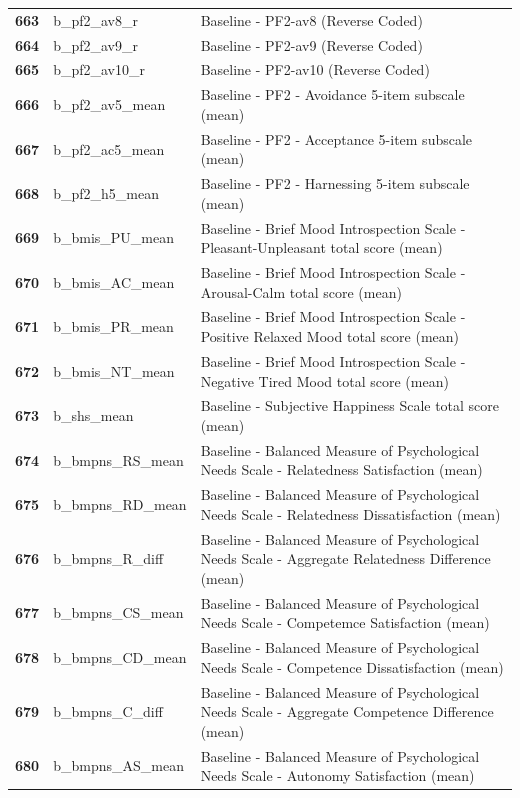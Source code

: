 \documentclass[
  letterpaper,
  DIV=11,
  numbers=noendperiod]{scrartcl}
\begin{document}
\begin{longtable}[t]{>{}cll}
\textbf{663} & b\_pf2\_av8\_r & Baseline - PF2-av8 (Reverse Coded)\\
\textbf{664} & b\_pf2\_av9\_r & Baseline - PF2-av9 (Reverse Coded)\\
\textbf{665} & b\_pf2\_av10\_r & Baseline - PF2-av10 (Reverse Coded)\\
\addlinespace
\textbf{666} & b\_pf2\_av5\_mean & Baseline - PF2 - Avoidance 5-item subscale (mean)\\
\textbf{667} & b\_pf2\_ac5\_mean & Baseline - PF2 - Acceptance 5-item subscale (mean)\\
\textbf{668} & b\_pf2\_h5\_mean & Baseline - PF2 - Harnessing 5-item subscale (mean)\\
\textbf{669} & b\_bmis\_PU\_mean & Baseline - Brief Mood Introspection Scale - Pleasant-Unpleasant total score (mean)\\
\textbf{670} & b\_bmis\_AC\_mean & Baseline - Brief Mood Introspection Scale - Arousal-Calm total score (mean)\\
\addlinespace
\textbf{671} & b\_bmis\_PR\_mean & Baseline - Brief Mood Introspection Scale - Positive Relaxed Mood total score (mean)\\
\textbf{672} & b\_bmis\_NT\_mean & Baseline - Brief Mood Introspection Scale - Negative Tired Mood total score (mean)\\
\textbf{673} & b\_shs\_mean & Baseline - Subjective Happiness Scale total score (mean)\\
\textbf{674} & b\_bmpns\_RS\_mean & Baseline - Balanced Measure of Psychological Needs Scale - Relatedness Satisfaction (mean)\\
\textbf{675} & b\_bmpns\_RD\_mean & Baseline - Balanced Measure of Psychological Needs Scale - Relatedness Dissatisfaction (mean)\\
\addlinespace
\textbf{676} & b\_bmpns\_R\_diff & Baseline - Balanced Measure of Psychological Needs Scale - Aggregate Relatedness Difference (mean)\\
\textbf{677} & b\_bmpns\_CS\_mean & Baseline - Balanced Measure of Psychological Needs Scale - Competemce Satisfaction (mean)\\
\textbf{678} & b\_bmpns\_CD\_mean & Baseline - Balanced Measure of Psychological Needs Scale - Competence Dissatisfaction (mean)\\
\textbf{679} & b\_bmpns\_C\_diff & Baseline -  Balanced Measure of Psychological Needs Scale - Aggregate Competence Difference (mean)\\
\textbf{680} & b\_bmpns\_AS\_mean & Baseline - Balanced Measure of Psychological Needs Scale - Autonomy Satisfaction (mean)\\

\end{longtable}
\end{document}
